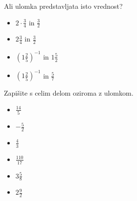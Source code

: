         
            \begin{naloga}
                Ali ulomka predstavljata isto vrednost?
                \begin{itemize}
                    \item $ 2\cdot\frac{3}{4}$ in $\frac{3}{2}$ 
                    \item $ 2\frac{3}{4}$ in $\frac{3}{2}$ 
                    \item $\left(1\frac{2}{5}\right)^{-1}$ in $ 1\frac{5}{2}$ 
                    \item $\left(1\frac{2}{5}\right)^{-1}$ in $\frac{5}{7}$ 
               \end{itemize}
            \end{naloga}
        

        
            \begin{naloga}
                Zapišite s celim delom oziroma z ulomkom.
                \begin{itemize}
                            \item $\frac{14}{5}$ 
                            \item $-\frac{5}{2}$ 
                            \item $\frac{4}{3}$ 
                            \item $\frac{110}{17}$ 
                            \item $ 3\frac{5}{8}$ 
                            \item $ 2\frac{9}{2}$                  
               \end{itemize}
            \end{naloga}
        



